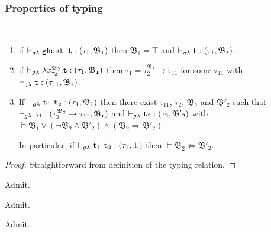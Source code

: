 \subsubsection{Properties of typing}
\begin{lemma}~\\
\vspace{-0.5cm}
\begin{enumerate}
	\item 
	if $\vdash_{g\lambda} \texttt{ghost t} : (\tau_{1}, \mathfrak{B_{1}})$ 
	then	$ \mathfrak{B_{1}} = \top $ 
	and $\vdash_{g\lambda} \texttt{t} : (\tau_{1}, \mathfrak{B_{2}}) $.
	
 	\item
 	if $\vdash_{g\lambda} \lambda x_{\tau_{2}}^{\mathfrak{B}_{2}}.\texttt{t} : (\tau_{1}, \mathfrak{B_{1}})$
 	then $\tau_{1} = \tau_{2}^{\mathfrak{B}_{2}} \rightarrow \tau_{11}$
 	for some $\tau_{11}$ with \mbox{$\vdash_{g\lambda} \texttt{t} : (\tau_{11}, \mathfrak{B_{1}}) $}.
  
 \item 
 	If ${\vdash_{g\lambda} \texttt{t}_{1}~ \texttt{t}_{2}  : (\tau_{1}, \mathfrak{B}_{1})}$
	then there exist $\tau_{11}$, $\tau_{2}$, $\mathfrak{B_{2}}$ and 	
	$\mathfrak{B'_{2}}$
	such that \\ 
	$\vdash_{g\lambda} \texttt{t}_{1} : (\tau_{2}^{\mathfrak{B}_{2}} \rightarrow \tau_{11}, \mathfrak{B_{1}})$
		and 
	${\vdash_{g\lambda} \texttt{t}_{2} : (\tau_{2}, \mathfrak{B'}_{2})}$ with \\
	 \quad
	\mbox{$\vDash \mathfrak{B}_{1} \vee (\neg \mathfrak{B}_{2} \wedge \mathfrak{B'}_{2} ) \wedge (\mathfrak{B}_{2} \Rightarrow \mathfrak{B'}_{2})$}. 
	
	In particular, if 
 		${\vdash_{g\lambda} \texttt{t}_{1}~ \texttt{t}_{2}  : (\tau_{1}, \bot)}$
then $\vDash \mathfrak{B_{2}} \Leftrightarrow \mathfrak{B'_{2}} $.
\end{enumerate}
\end{lemma} 
\begin{proof}
Straightforward from definition of the typing relation.
\end{proof}

\begin{lemma}[Progress] Admit.
\end{lemma}
\begin{lemma}[Preservation] Admit.
\end{lemma}
\begin{theorem}[Soundness] Admit.
\end{theorem}
